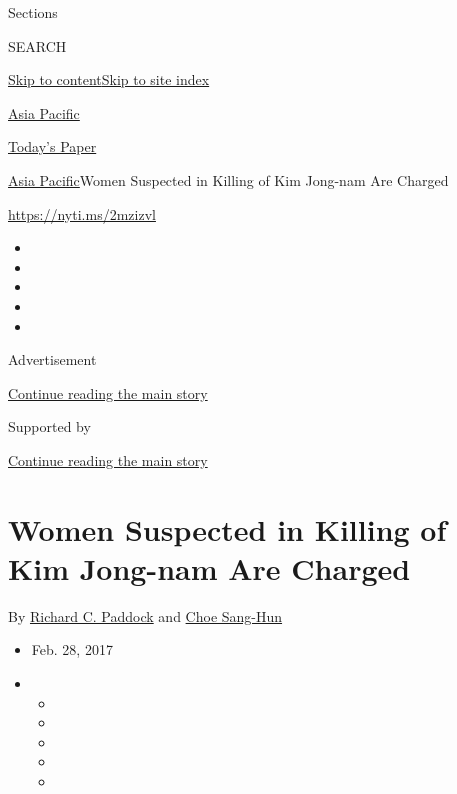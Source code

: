 Sections

SEARCH

\protect\hyperlink{site-content}{Skip to
content}\protect\hyperlink{site-index}{Skip to site index}

\href{https://www.nytimes3xbfgragh.onion/section/world/asia}{Asia
Pacific}

\href{https://myaccount.nytimes3xbfgragh.onion/auth/login?response_type=cookie\&client_id=vi}{}

\href{https://www.nytimes3xbfgragh.onion/section/todayspaper}{Today's
Paper}

\href{/section/world/asia}{Asia Pacific}\textbar{}Women Suspected in
Killing of Kim Jong-nam Are Charged

\url{https://nyti.ms/2mzizvl}

\begin{itemize}
\item
\item
\item
\item
\item
\end{itemize}

Advertisement

\protect\hyperlink{after-top}{Continue reading the main story}

Supported by

\protect\hyperlink{after-sponsor}{Continue reading the main story}

\hypertarget{women-suspected-in-killing-of-kim-jong-nam-are-charged}{%
\section{Women Suspected in Killing of Kim Jong-nam Are
Charged}\label{women-suspected-in-killing-of-kim-jong-nam-are-charged}}

By
\href{https://www.nytimes3xbfgragh.onion/by/richard-c-paddock}{Richard
C. Paddock} and
\href{http://www.nytimes3xbfgragh.onion/by/choe-sang-hun}{Choe Sang-Hun}

\begin{itemize}
\item
  Feb. 28, 2017
\item
  \begin{itemize}
  \item
  \item
  \item
  \item
  \item
  \end{itemize}
\end{itemize}

